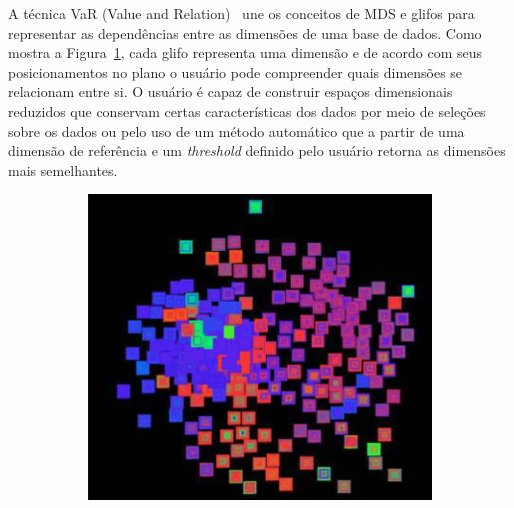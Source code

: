 A técnica VaR (Value and Relation)~\cite{Yang2004} une os conceitos de MDS e glifos para representar as dependências entre as dimensões de uma base de dados. Como mostra a Figura~\ref{fig:var1}, cada glifo representa uma dimensão e de acordo com seus posicionamentos no plano o usuário pode compreender quais dimensões se relacionam entre si. O usuário é capaz de construir espaços dimensionais reduzidos que conservam certas características dos dados por meio de seleções sobre os dados ou pelo uso de um método automático que a partir de uma dimensão de referência e um \emph{threshold} definido pelo usuário retorna as dimensões mais semelhantes.

\begin{figure}[h!]
  \centering
  \begin{subfigure}[b]{0.5\textwidth}
    \centering
    \includegraphics[width=\textwidth]{images/var1.png}
    \caption{}
    \label{fig:var1}
  \end{subfigure}%
  ~ %
  \begin{subfigure}[b]{0.475\textwidth}
    \centering

\end{subfigure}
\end{figure}
